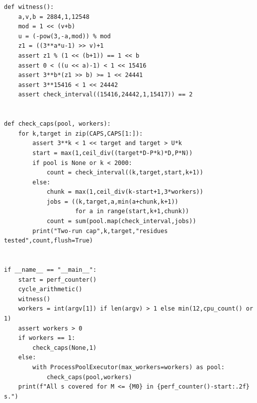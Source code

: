 \documentclass[11pt]{article}
\theoremstyle{definition}
\begin{document}
\begin{lstlisting}
def witness():
    a,v,b = 2884,1,12548
    mod = 1 << (v+b)
    u = (-pow(3,-a,mod)) % mod
    z1 = ((3**a*u-1) >> v)+1
    assert z1 % (1 << (b+1)) == 1 << b
    assert 0 < ((u << a)-1) < 1 << 15416
    assert 3**b*(z1 >> b) >= 1 << 24441
    assert 3**15416 < 1 << 24442
    assert check_interval((15416,24442,1,15417)) == 2


def check_caps(pool, workers):
    for k,target in zip(CAPS,CAPS[1:]):
        assert 3**k < 1 << target and target > U*k
        start = max(1,ceil_div((target*D-P*k)*D,P*N))
        if pool is None or k < 2000:
            count = check_interval((k,target,start,k+1))
        else:
            chunk = max(1,ceil_div(k-start+1,3*workers))
            jobs = ((k,target,a,min(a+chunk,k+1))
                    for a in range(start,k+1,chunk))
            count = sum(pool.map(check_interval,jobs))
        print("Two-run cap",k,target,"residues tested",count,flush=True)


if __name__ == "__main__":
    start = perf_counter()
    cycle_arithmetic()
    witness()
    workers = int(argv[1]) if len(argv) > 1 else min(12,cpu_count() or 1)
    assert workers > 0
    if workers == 1:
        check_caps(None,1)
    else:
        with ProcessPoolExecutor(max_workers=workers) as pool:
            check_caps(pool,workers)
    print(f"All s covered for M <= {M0} in {perf_counter()-start:.2f} s.")
\end{lstlisting}
\end{document}
